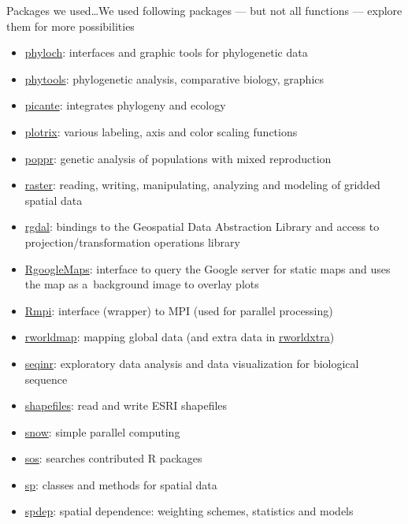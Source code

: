 \documentclass[compress, ucs, xelatex, 11pt, xcolor=svgnames, aspectratio=169,
	hyperref={
		bookmarks=true,
		unicode=true,
		colorlinks=true,
		pdftitle={Molecular data in R},
		plainpages=false,
		pdfauthor={Vojtech Zeisek},
		pdfsubject={Course about phylogeny and evolution in R},
		pdfcreator={XeLaTeX},
		pdfkeywords={R, evolution, phylogeny, molecular data},
		linkcolor=Crimson, %
		anchorcolor=Magenta, %
		citecolor=Magenta, %
		filecolor=Magenta, %
		menucolor=Magenta, %
		urlcolor=DodgerBlue, %
		pdftex},
	url={hyphens, lowtilde} %
	]{beamer}
\begin{document}
\begin{frame}[allowframebreaks]{Packages we used\ldots}{We used following packages --- but not all functions --- explore them for more possibilities}
\begin{itemize}
		\item \href{http://www.christophheibl.de/Rpackages.html}{phyloch}: interfaces and graphic tools for phylogenetic data
		\item \href{https://CRAN.R-project.org/package=phytools}{phytools}: phylogenetic analysis, comparative biology, graphics
		\item \href{https://CRAN.R-project.org/package=picante}{picante}: integrates phylogeny and ecology
		\item \href{https://CRAN.R-project.org/package=plotrix}{plotrix}: various labeling, axis and color scaling functions
		\item \href{https://CRAN.R-project.org/package=poppr}{poppr}: genetic analysis of populations with mixed reproduction
		\item \href{https://CRAN.R-project.org/package=raster}{raster}: reading, writing, manipulating, analyzing and modeling of gridded spatial data
		\item \href{https://CRAN.R-project.org/package=rgdal}{rgdal}: bindings to the Geospatial Data Abstraction Library and access to projection/transformation operations library
		\item \href{https://CRAN.R-project.org/package=RgoogleMaps}{RgoogleMaps}: interface to query the Google server for static maps and uses the map as a~background image to overlay plots
		\item \href{https://CRAN.R-project.org/package=Rmpi}{Rmpi}: interface (wrapper) to MPI (used for parallel processing)
		\item \href{https://CRAN.R-project.org/package=rworldmap}{rworldmap}: mapping global data (and extra data in \href{https://CRAN.R-project.org/package=rworldxtra}{rworldxtra})
		\item \href{https://CRAN.R-project.org/package=seqinr}{seqinr}: exploratory data analysis and data visualization for biological sequence
		\item \href{https://CRAN.R-project.org/package=shapefiles}{shapefiles}: read and write ESRI shapefiles
		\item \href{https://CRAN.R-project.org/package=snow}{snow}: simple parallel computing
		\item \href{https://CRAN.R-project.org/package=sos}{sos}: searches contributed R packages
		\item \href{https://CRAN.R-project.org/package=sp}{sp}: classes and methods for spatial data
		\item \href{https://CRAN.R-project.org/package=spdep}{spdep}: spatial dependence: weighting schemes, statistics and models

\end{itemize}
\end{frame}
\end{document}
